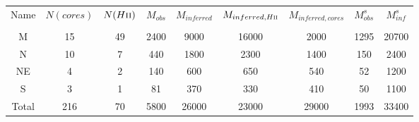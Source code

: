 \begin{table*}[htp]
\begin{tabular}{ccccccccc}
\label{tab:clustermassestimates}
Name & $N(cores)$ & $N(H\textsc{ii})$ & $M_{obs}$ & $M_{inferred}$ & $M_{inferred, H\textsc{ii}}$ & $M_{inferred, cores}$ & $M_{obs}^s$ & $M_{inf}^s$ \\
 &  &  &  &  &  &  &  &  \\
\hline
M & 15 & 49 & 2400 & 9000 & 16000 & 2000 & 1295 & 20700 \\
N & 10 & 7 & 440 & 1800 & 2300 & 1400 & 150 & 2400 \\
NE & 4 & 2 & 140 & 600 & 650 & 540 & 52 & 1200 \\
S & 3 & 1 & 81 & 370 & 330 & 410 & 50 & 1100 \\
Total & 216 & 70 & 5800 & 26000 & 23000 & 29000 & 1993 & 33400 \\
\hline
\end{tabular}
\end{table*}
